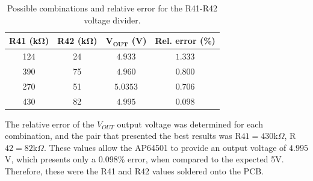 \begingroup
\begin{table}[H]
	\caption{Possible combinations and relative error for the R41-R42 voltage divider.}
	\label{tab:R41_R42_values}
	\centering%
	\begin{tabular}{cccc}
        \toprule
        \textbf{R41} \textbf{(k}$\mathbf{\Omega}$\textbf{)} & \textbf{R42} \textbf{(k}$\mathbf{\Omega}$\textbf{)} & $\mathbf{V_{OUT}}$ \textbf{(V)} & \textbf{Rel. error (\%)} \\
        \midrule
        124 & 24 & $4.933$ & $1.333$ \\
		\midrule
		390 & 75 & $4.960$ & $0.800$ \\
		\midrule
		270 & 51 & $5.0353$ & $0.706$ \\
		\midrule
		430 & 82 & $4.995$ & $0.098$ \\
        \bottomrule
    \end{tabular}
\end{table}
\endgroup

The relative error of the $V_{OUT}$ output voltage was determined for each combination, and the pair that presented the best results was R$41=430$k$\Omega$, R$42=82$k$\Omega$. These values allow the AP64501 to provide an output voltage of $4.995$V, which presents only a $0.098\%$ error, when compared to the expected 5V. Therefore, these were the R41 and R42 values soldered onto the PCB.



